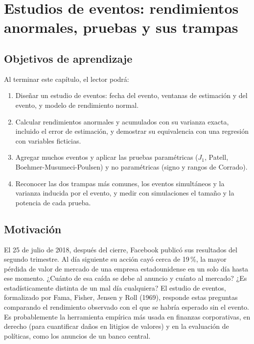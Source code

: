 \chapter[Estudios de eventos]{Estudios de eventos: rendimientos anormales, pruebas y sus trampas}\label{cap:eventos}

\section*{Objetivos de aprendizaje}
Al terminar este capítulo, el lector podrá:
\begin{enumerate}[label=\arabic*.,leftmargin=*]
  \item Diseñar un estudio de eventos: fecha del evento, ventanas de estimación y del evento, y modelo de rendimiento
        normal.
  \item Calcular rendimientos anormales y acumulados con su varianza exacta, incluido el error de estimación, y
        demostrar su equivalencia con una regresión con variables ficticias.
  \item Agregar muchos eventos y aplicar las pruebas paramétricas ($J_1$, Patell, Boehmer-Musumeci-Poulsen) y no
        paramétricas (signo y rangos de Corrado).
  \item Reconocer las dos trampas más comunes, los eventos simultáneos y la varianza inducida por el evento, y medir
        con simulaciones el tamaño y la potencia de cada prueba.
\end{enumerate}

\section*{Motivación}
El 25 de julio de 2018, después del cierre, Facebook publicó sus resultados del segundo trimestre. Al día siguiente su
acción cayó cerca de 19\,\%, la mayor pérdida de valor de mercado de una empresa estadounidense en un solo día hasta ese
momento. ¿Cuánto de esa caída se debe al anuncio y cuánto al mercado? ¿Es estadísticamente distinta de un mal día
cualquiera? El estudio de eventos, formalizado por Fama, Fisher, Jensen y Roll (1969), responde estas preguntas comparando el
rendimiento observado con el que se habría esperado sin el evento. Es probablemente la herramienta empírica más usada
en finanzas corporativas, en derecho (para cuantificar daños en litigios de valores) y en la evaluación de políticas,
como los anuncios de un banco central.

